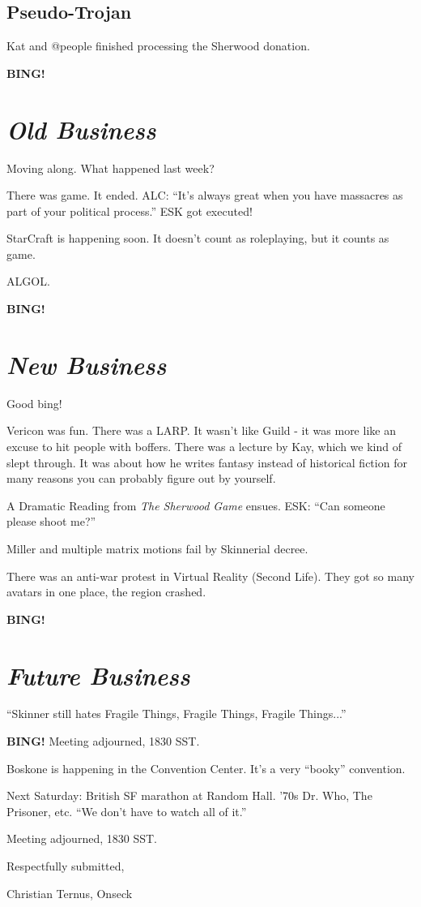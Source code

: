 \documentclass[10pt]{article}
\newcommand{\bing}{{\bf BING!} }
\newcommand{\goto}[1]{\bing \vskip 12pt \section*{{\em{#1}}}}
\begin{document}
\subsection*{Pseudo-Trojan}
Kat and @people finished processing the Sherwood donation.



\goto{Old Business}

Moving along.  What happened last week?

There was game.  It ended.  ALC:  ``It's always great when you have massacres as part of your political process.''  ESK got executed!

StarCraft is happening soon.  It doesn't count as roleplaying, but it counts as game.

ALGOL.

\goto{New Business}

Good bing!

Vericon was fun.  There was a LARP.  It wasn't like Guild - it was more like an excuse to hit people with boffers.  There was a lecture by Kay, which we kind of slept through.  It was about how he writes fantasy instead of historical fiction for many reasons you can probably figure out by yourself.

A Dramatic Reading from \emph{The Sherwood Game} ensues.  ESK:  ``Can someone please shoot me?''

Miller and multiple matrix motions fail by Skinnerial decree.

There was an anti-war protest in Virtual Reality (Second Life).  They got so many avatars in one place, the region crashed.

\goto{Future Business}

``Skinner still hates Fragile Things, Fragile Things, Fragile Things...''

\bing
Meeting adjourned, 1830 SST.

Boskone is happening in the Convention Center.  It's a very ``booky'' convention.

Next Saturday:  British SF marathon at Random Hall.  '70s Dr. Who, The Prisoner, etc.  ``We don't have to watch all of it.''  


\noindent
Meeting adjourned, 1830 SST.

\vspace{18pt}

\centerline{Respectfully submitted,}
\centerline{Christian Ternus, Onseck}
\end{document}

